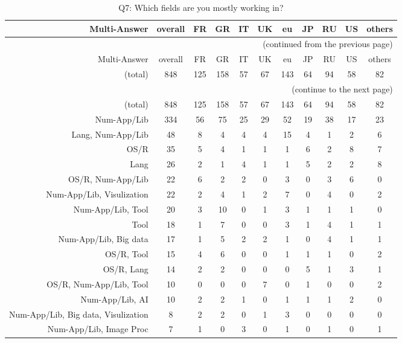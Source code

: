\clearpage%
{\footnotesize\begin{landscape}%
\begin{longtable}[htb]{r|c|c|c|c|c|c|c|c|c|c}%
\caption{Q7: Which fields are you mostly working in?}%
\label{tab:Q7-mans} \\%
\hline%
Multi-Answer & overall & FR & GR & IT & UK & eu & JP & RU & US & others \\
 \hline%
\endfirsthead%
\multicolumn{11}{r}{(continued from the previous page)}\\%
\hline%
Multi-Answer & overall & FR & GR & IT & UK & eu & JP & RU & US & others \\
 \hline%
\endhead%
\hline%
(total) & 848 & 125 & 158 & 57 & 67 & 143 & 64 & 94 & 58 & 82 \\%
\hline%
\multicolumn{11}{r}{(continue to the next page)}\\%
\endfoot%
\hline%
(total) & 848 & 125 & 158 & 57 & 67 & 143 & 64 & 94 & 58 & 82 \\%
\hline%
\endlastfoot%
\hline%
{Num-App/Lib} & 334 & 56 & 75 & 25 & 29 & 52 & 19 & 38 & 17 & 23 \\%
{Lang, Num-App/Lib} & 48 & 8 & 4 & 4 & 4 & 15 & 4 & 1 & 2 & 6 \\%
{OS/R} & 35 & 5 & 4 & 1 & 1 & 1 & 6 & 2 & 8 & 7 \\%
{Lang} & 26 & 2 & 1 & 4 & 1 & 1 & 5 & 2 & 2 & 8 \\%
{OS/R, Num-App/Lib} & 22 & 6 & 2 & 2 & 0 & 3 & 0 & 3 & 6 & 0 \\%
{Num-App/Lib, Visulization} & 22 & 2 & 4 & 1 & 2 & 7 & 0 & 4 & 0 & 2 \\%
{Num-App/Lib, Tool} & 20 & 3 & 10 & 0 & 1 & 3 & 1 & 1 & 1 & 0 \\%
{Tool} & 18 & 1 & 7 & 0 & 0 & 3 & 1 & 4 & 1 & 1 \\%
{Num-App/Lib, Big data} & 17 & 1 & 5 & 2 & 2 & 1 & 0 & 4 & 1 & 1 \\%
{OS/R, Tool} & 15 & 4 & 6 & 0 & 0 & 1 & 1 & 1 & 0 & 2 \\%
{OS/R, Lang} & 14 & 2 & 2 & 0 & 0 & 0 & 5 & 1 & 3 & 1 \\%
{OS/R, Num-App/Lib, Tool} & 10 & 0 & 0 & 0 & 7 & 0 & 1 & 0 & 0 & 2 \\%
{Num-App/Lib, AI} & 10 & 2 & 2 & 1 & 0 & 1 & 1 & 1 & 2 & 0 \\%
{Num-App/Lib, Big data, Visulization} & 8 & 2 & 2 & 0 & 1 & 3 & 0 & 0 & 0 & 0 \\%
{Num-App/Lib, Image Proc} & 7 & 1 & 0 & 3 & 0 & 1 & 0 & 1 & 0 & 1 \\%

\end{longtable}
\end{landscape}}
